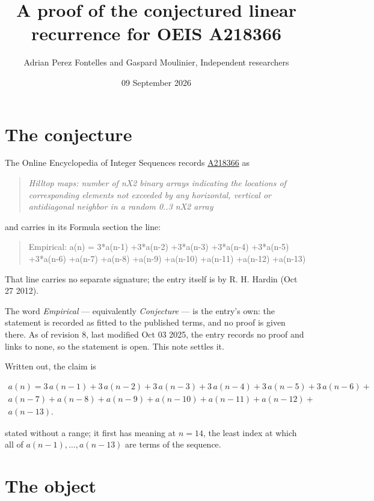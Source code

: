 \documentclass[11pt]{article}
\title{A proof of the conjectured linear recurrence for OEIS A218366}
\author{Adrian Perez Fontelles and Gaspard Moulinier, Independent researchers}
\date{09 September 2026}
\theoremstyle{definition}
\begin{document}
\maketitle
\section{The conjecture}

The Online Encyclopedia of Integer Sequences records \href{https://oeis.org/A218366}{A218366} as

\begin{quote}\itshape Hilltop maps: number of nX2 binary arrays indicating the locations of corresponding elements not exceeded by any horizontal, vertical or antidiagonal neighbor in a random 0..3 nX2 array\end{quote}

and carries in its Formula section the line:

\begin{quote}\ttfamily Empirical: a(n) = 3*a(n-1) +3*a(n-2) +3*a(n-3) +3*a(n-4) +3*a(n-5) +3*a(n-6) +a(n-7) +a(n-8) +a(n-9) +a(n-10) +a(n-11) +a(n-12) +a(n-13)\end{quote}

That line carries no separate signature; the entry itself is by R. H. Hardin (Oct 27 2012).

The word {\itshape Empirical} --- equivalently {\itshape Conjecture} --- is the entry's own: the statement is recorded as fitted to the published terms, and no proof is given there. As of revision 8, last modified Oct 03 2025, the entry records no proof and links to none, so the statement is open. This note settles it.

Written out, the claim is

\begin{multline*} a(n) = 3\,a(n-1) + 3\,a(n-2) + 3\,a(n-3) + 3\,a(n-4) + 3\,a(n-5) + 3\,a(n-6) + \\ a(n-7) + a(n-8) + a(n-9) + a(n-10) + a(n-11) + a(n-12) + \\ a(n-13). \end{multline*}

stated without a range; it first has meaning at $n = 14$, the least index at which all of $a(n-1),\dots,a(n-13)$ are terms of the sequence.

\section{The object}
\end{document}
